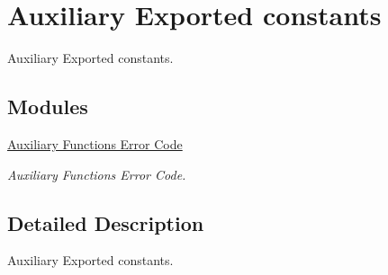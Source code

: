 \hypertarget{group___k_n_x___aux___exported___consts}{}\section{Auxiliary Exported constants}
\label{group___k_n_x___aux___exported___consts}


Auxiliary Exported constants.  


\subsection*{Modules}
\begin{DoxyCompactItemize}
\item 
\hyperlink{group___k_n_x___aux___error___code}{Auxiliary Functions\textquotesingle{} Error Code}
\begin{DoxyCompactList}\small\item\em Auxiliary Functions\textquotesingle{} Error Code. \end{DoxyCompactList}\end{DoxyCompactItemize}


\subsection{Detailed Description}
Auxiliary Exported constants. 

